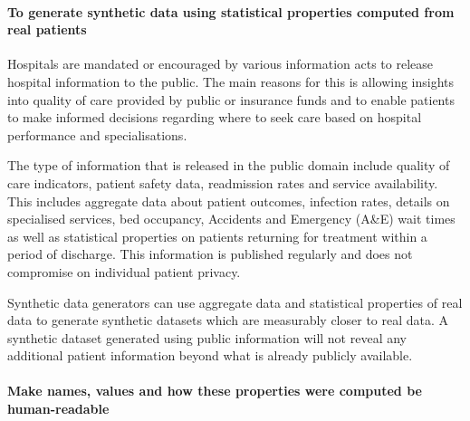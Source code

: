 \documentclass[11pt]{article}
\begin{document}
\paragraph{To generate synthetic data using statistical properties computed from real patients}
Hospitals are mandated or encouraged by various information acts to release hospital information to the public. The main reasons for this is allowing insights into quality of care provided by public or insurance funds and to enable patients to make informed decisions regarding where to seek care based on hospital performance and specialisations\cite{Werner2005}. 

The type of information that is released in the public domain include quality of care indicators, patient safety data, readmission rates and service availability. This includes aggregate data about patient outcomes, infection rates, details on specialised services, bed occupancy, Accidents and Emergency (A\&E) wait times as well as statistical properties on patients returning for treatment within a period of discharge. This information is published regularly and does not compromise on individual patient privacy.  

Synthetic data generators can use aggregate data and statistical properties of real data to generate synthetic datasets which are measurably closer to real data. A synthetic dataset generated using public information will not reveal any additional patient information beyond what is already publicly available.

    

\paragraph{Make names, values and how these properties were computed be human-readable}

    
\end{document}
